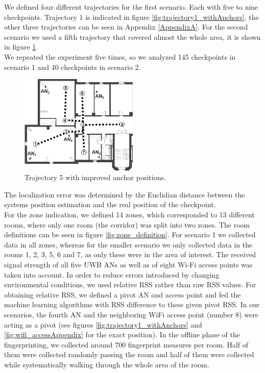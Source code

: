 \noindent\hspace*{5mm}%
We defined four different trajectories for the first scenario. Each with five to nine checkpoints. Trajectory 1 is indicated in figure \ref{fig:trajectory1_withAnchors}, the other three trajectories can be seen in Appendix \ref{AppendixA}.
For the second scenario we used a fifth trajectory that covered almost the whole area, it is shown in figure \ref{fig:trajectory5_withAnchors}.\\
\noindent\hspace*{5mm}%
We repeated the experiment five times, so we analyzed 145 checkpoints in scenario 1 and 40 checkpoints in scenario 2.\begin{figure}[th]
\centering
\includegraphics[width=0.5\textwidth]{Figures/trajectory5_withAnchors}
\decoRule
\caption[Trajectory 5]{Trajectory 5 with improved anchor positions.}
\label{fig:trajectory5_withAnchors}
\end{figure}
The localization error was determined by the Euclidian distance between the systems position estimation and the real position of the checkpoint.\\
\noindent\hspace*{5mm}%
For the zone indication, we defined 14 zones, which corresponded to 13 different rooms, where only one room (the corridor) was split into two zones. The room definitions can be seen in figure \ref{fig:zone_definition}. For scenario 1 we collected data in all zones, whereas for the smaller scenario we only collected data in the rooms 1, 2, 3, 5, 6 and 7, as only these were in the area of interest. The received signal strength of all five UWB ANs as well as of eight Wi-Fi access points was taken into account. In order to reduce errors introduced by changing environmental conditions, we used relative RSS rather than raw RSS values. For obtaining relative RSS, we defined a pivot AN and access point and fed the machine learning algorithms with RSS difference to these given pivot RSS. In our scenarios, the fourth AN and the neighboring WiFi access point (number 8) were acting as a pivot (see figures \ref{fig:trajectory1_withAnchors} and \ref{fig:wifi_accessAppendix} for the exact position). In the offline phase of the fingerprinting, we collected around 700 fingerprint measures per room. Half of them were collected randomly passing the room and half of them were collected while systematically walking through the whole area of the room.
